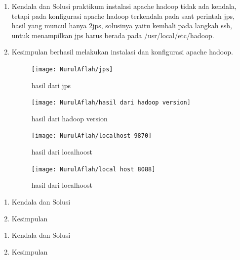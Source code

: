 
\begin{enumerate}
\item Kendala dan Solusi
\newline praktikum instalasi apache hadoop tidak ada kendala, tetapi pada konfigurasi apache hadoop terkendala pada saat perintah jps, hasil yang muncul hanya 2jps, solusinya yaitu kembali pada langkah ssh, untuk menampilkan jps harus berada pada /usr/local/etc/hadoop.

\item Kesimpulan
\newline berhasil melakukan instalasi dan konfigurasi apache hadoop.

\begin{figure} [!ht]
\texttt{[image: NurulAflah/jps]}
\caption{hasil dari jps}
\label{gam:jps}
\end{figure}

\begin{figure} [!ht]
\texttt{[image: NurulAflah/hasil dari hadoop version]}
\caption{hasil dari hadoop version}
\label{gam:hasil dari hadoop version}
\end{figure}

\begin{figure} [!ht]
\texttt{[image: NurulAflah/localhost 9870]}
\caption{hasil dari localhoost}
\label{gam:localhost 9870}
\end{figure}

\begin{figure} [!ht]
\texttt{[image: NurulAflah/local host 8088]}
\caption{hasil dari localhoost}
\label{gam:local host 8088}
\end{figure}
\end{enumerate}


\begin{enumerate}
\item Kendala dan Solusi

\item Kesimpulan

\end{enumerate}

\begin{enumerate}
\item Kendala dan Solusi

\item Kesimpulan

\end{enumerate}

